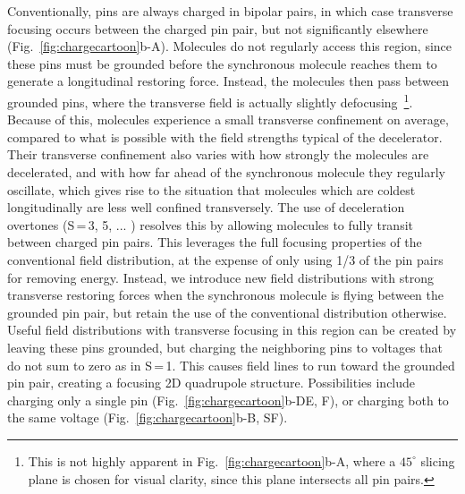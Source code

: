 \documentclass[%
 reprint,
 amsmath,amssymb,
 aps,
prl,
]{revtex4-1}
\begin{document}
Conventionally, pins are always charged in bipolar pairs, in which case transverse focusing occurs between the charged pin pair, but not significantly elsewhere (Fig.~\ref{fig:chargecartoon}b-A).
Molecules do not regularly access this region, since these pins must be grounded before the synchronous molecule reaches them to generate a longitudinal restoring force.
Instead, the molecules then pass between grounded pins, where the transverse field is actually slightly defocusing~\footnote{This is not highly apparent in Fig.~\ref{fig:chargecartoon}b-A, where a $45^\circ$ slicing plane is chosen for visual clarity, since this plane intersects all pin pairs.}.
Because of this, molecules experience a small transverse confinement on average, compared to what is possible with the field strengths typical of the decelerator. 
Their transverse confinement also varies with how strongly the molecules are decelerated, and with how far ahead of the synchronous molecule they regularly oscillate, which gives rise to the situation that molecules which are coldest longitudinally are less well confined transversely.
The use of deceleration overtones (S\,=\,3, 5, ... ) \cite{VanDeMeerakker2005a} resolves this by allowing molecules to fully transit between charged pin pairs. 
This leverages the full focusing properties of the conventional field distribution, at the expense of only using 1/3 of the pin pairs for removing energy. 
Instead, we introduce new field distributions with strong transverse restoring forces when the synchronous molecule is flying between the grounded pin pair, but retain the use of the conventional distribution otherwise.
Useful field distributions with transverse focusing in this region can be created by leaving these pins grounded, but charging the neighboring pins to voltages that do not sum to zero as in S\,=\,1.
This causes field lines to run toward the grounded pin pair, creating a focusing 2D quadrupole structure.
Possibilities include charging only a single pin (Fig.~\ref{fig:chargecartoon}b-DE, F), or charging both to the same voltage (Fig.~\ref{fig:chargecartoon}b-B, SF).
\end{document}
